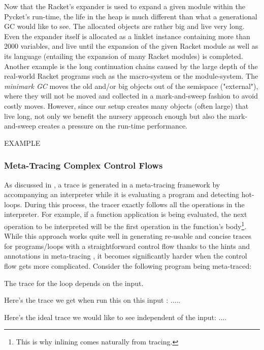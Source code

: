 Now that the Racket's expander is used to expand a given module within
the Pycket's run-time, the life in the heap is much different than
what a generational GC would like to see. The allocated objects are
rather big and live very long. Even the expander itself is allocated
as a linklet instance containing more than 2000 variables, and live
until the expansion of the given Racket module as well as its language
(entailing the expansion of many Racket modules) is completed. Another
example is the long continuation chains caused by the large depth of
the real-world Racket programs such as the macro-system or the
module-system. The \emph{minimark GC} moves the old and/or big objects
out of the semispace ("external"), where they will not be moved and
collected in a mark-and-sweep fashion to avoid costly moves. However,
since our setup creates many objects (often large) that live long, not
only we benefit the nursery approach enough but also the
mark-and-sweep creates a pressure on the run-time performance.

EXAMPLE

\newpage

\subsubsection{Meta-Tracing Complex Control Flows}

As discussed in , a trace is generated in a
meta-tracing framework by accompanying an interpreter while it is
evaluating a program and detecting hot-loops. During this process, the
tracer exactly follows all the operations in the interpreter. For
example, if a function application is being evaluated, the next
operation to be interpreted will be the first operation in the
function's body\footnote{This is why inlining comes naturally from
  tracing.}. While this approach works quite well in generating
re-usable and concise traces for programs/loops with a straightforward
control flow thanks to the hints and annotations in meta-tracing
\cite{bolz09}, it becomes significantly harder when the control flow
gets more complicated. Consider the following program being
meta-traced:




The trace for the loop depends on the input.

Here's the trace we get when run this on this input : .....

Here's the ideal trace we would like to see independent of the input: ....
